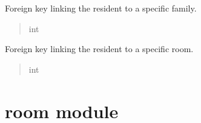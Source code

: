 \documentclass[letterpaper,10pt,english]{sphinxmanual}
\begin{document}
\begin{fulllineitems}

\begin{fulllineitems}
\label{\detokenize{app.mysql:app.mysql.resident.Resident.idFamily}}
\pysigstartsignatures
\pysigline
{}
\pysigstopsignatures
\sphinxAtStartPar
Foreign key linking the resident to a specific family.
\begin{quote}\begin{description}
\sphinxAtStartPar
int

\end{description}\end{quote}

\end{fulllineitems}


\begin{fulllineitems}
\label{\detokenize{app.mysql:app.mysql.resident.Resident.idRoom}}
\pysigstartsignatures
\pysigline
{}
\pysigstopsignatures
\sphinxAtStartPar
Foreign key linking the resident to a specific room.
\begin{quote}\begin{description}
\sphinxAtStartPar
int

\end{description}\end{quote}

\end{fulllineitems}


\end{fulllineitems}



\section{room module}
\label{\detokenize{app.mysql:module-app.mysql.room}}\label{\detokenize{app.mysql:room-module}}
\end{document}
